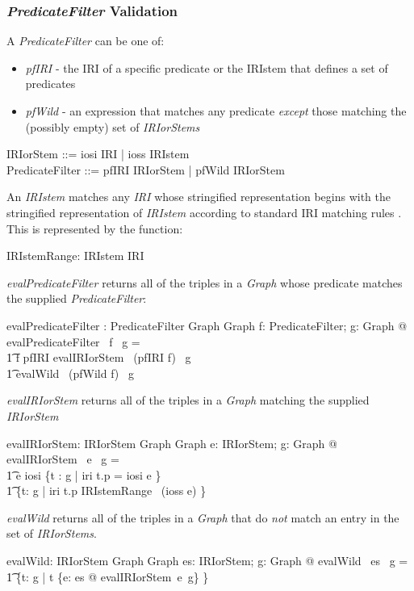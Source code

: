 \documentclass[fuzz]{llncs}
\def\entryFor{\cdot}
\def\zc{\textit}
\begin{document}
\subsubsection{\zc{PredicateFilter} Validation}
A \zc{PredicateFilter} can be one of:
\begin{itemize}
\item \zc{pfIRI} - the IRI of a specific predicate or the IRIstem that defines a set of
predicates
\item \zc{pfWild} - an expression that matches any predicate \emph{except} those matching the (possibly empty) set of \zc{IRIorStems} 
\end{itemize}
\begin{zed}
IRIorStem ::= iosi \ldata IRI \rdata | ioss \ldata IRIstem \rdata \\
PredicateFilter ::= pfIRI \ldata IRIorStem \rdata | pfWild \ldata \power IRIorStem \rdata
\end{zed}
An \zc{IRIstem} matches any \zc{IRI} whose stringified representation begins with the stringified
representation of \zc{IRIstem} according to standard IRI matching rules \cite{RFC3987}. This is represented by the function:
\begin{zed}
[IRIstem]
\end{zed}
\begin{gendef}
	IRIstemRange: IRIstem \pfun \power IRI
\end{gendef}
\zc{evalPredicateFilter} returns all of the triples in a \zc{Graph} whose predicate
matches the supplied \zc{PredicateFilter}:
\begin{gendef}
   evalPredicateFilter : PredicateFilter \pfun Graph \pfun Graph
\where
   \forall f: PredicateFilter; g: Graph @ evalPredicateFilter~ f ~g = \\
\t1 \IF f \in \ran pfIRI \THEN evalIRIorStem~ (pfIRI \entryFor f)~ g \\
\t1 \ELSE evalWild~ (pfWild \entryFor f)~ g
\end{gendef}
\zc{evalIRIorStem} returns all of the triples in a \zc{Graph} matching the supplied 
\zc{IRIorStem}
\begin{gendef}
   evalIRIorStem: IRIorStem \pfun Graph \pfun Graph
\where
   \forall e: IRIorStem; g: Graph @ evalIRIorStem~ e ~g = \\
\t1 \IF e \in \ran iosi \THEN \{t : g | iri \entryFor t.p = iosi \entryFor e \} \\
\t1 \ELSE \{t: g | iri \entryFor t.p \in IRIstemRange~ (ioss \entryFor e) \}
\end{gendef}
\zc{evalWild} returns all of the triples in a \zc{Graph} that do \emph{not} match an entry
in the set of \zc{IRIorStems}.
\begin{gendef}
   evalWild: \power IRIorStem \pfun Graph \pfun Graph
\where
   \forall es: \power IRIorStem; g: Graph @ evalWild ~es ~g = \\
\t1 \{t: g | t \notin \bigcup \{e: es @ evalIRIorStem~e~g\} \}
\end{gendef}
\end{document}
